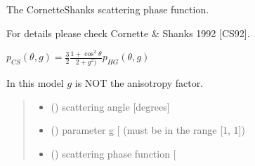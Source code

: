 \documentclass[letterpaper,10pt,english]{sphinxmanual}
\begin{document}
\begin{fulllineitems}
\label{\detokenize{06_anisotropy_factor:skinoptics.anisotropy_factor.ptheta_CS}}
\pysigstartsignatures
{}
\pysigstopsignatures
\begin{DUlineblock}{0em}
\item[] The Cornette\sphinxhyphen{}Shanks scattering phase function.
\item[] For details please check Cornette \& Shanks 1992 {[}CS92{]}.
\end{DUlineblock}

\sphinxAtStartPar
\(p_{CS}(\theta, g) = \frac{3}{2}\frac{1 + \cos^2\theta}{2 + g^2)} p_{HG}(\theta, g)\)

\begin{DUlineblock}{0em}
\item[] In this model \(g\) is NOT the anisotropy factor.
\end{DUlineblock}
\begin{quote}\begin{description}
\begin{itemize}
\item {} 
\sphinxAtStartPar
{} () \textendash{} scattering angle {[}degrees{]}

\item {} 
\sphinxAtStartPar
{} () \textendash{} parameter g {[}\sphinxhyphen{}{]} (must be in the range {[}\sphinxhyphen{}1, 1{]})

\end{itemize}

\sphinxAtStartPar
\begin{itemize}
\item {} 
\sphinxAtStartPar
{} () \textendash{} scattering phase function {[}\sphinxhyphen{}{]}

\end{itemize}


\end{description}\end{quote}

\end{fulllineitems}
\end{document}
